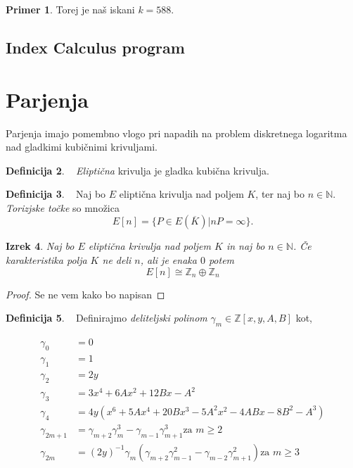 \documentclass[12pt,a4paper,twoside]{article}
\theoremstyle{definition} %
\newtheorem{definicija}{Definicija}[section]
\newtheorem{primer}[definicija]{Primer}
\theoremstyle{plain} %
\newtheorem{izrek}[definicija]{Izrek}
\numberwithin{equation}{section}  %
\newcommand{\N}{\mathbb N}
\newcommand{\Z}{\mathbb Z}
\newcommand{\E}[1]{E({#1})}
\begin{document}
\begin{primer}
Torej je naš iskani $k=588$.

\end{primer}
\subsection{Index Calculus program}


\section{Parjenja}

Parjenja imajo pomembno vlogo pri napadih na problem diskretnega logaritma nad gladkimi kubičnimi krivuljami.

\begin{definicija}~
\emph{Eliptična} krivulja je gladka kubična krivulja.
\end{definicija}

\begin{definicija}~
Naj bo $E$ eliptična krivulja nad poljem $K$, ter naj bo $n\in \N$. \emph{Torizjske točke} so množica
$$E[n] = \{ P \in \E{\overline{K}} | nP = \infty \}.$$
\end{definicija}

\begin{izrek}
\label{IzrekTor}
Naj bo $E$ eliptična krivulja nad poljem $K$ in naj bo $n \in \N$. Če karakteristika polja $K$ ne deli $n$, ali je enaka $0$ potem
$$E[n] \cong \mathbb{Z}_n \oplus \mathbb{Z}_n$$

\end{izrek}

\begin{proof}
Se ne vem kako bo napisan
\end{proof}

\begin{definicija}~
Definirajmo \emph{deliteljski polinom} $\gamma_m \in \Z[x,y,A,B]$ kot,


\begin{align}
\gamma_0 &{}= 0  \nonumber \\
\gamma_1 &{}= 1  \nonumber \\
\gamma_2 &{}= 2y  \nonumber \\
\gamma_3 &{}= 3x^4 + 6Ax^2 + 12Bx-A^2 \nonumber \\
\gamma_4 &{}= 4y(x^6+5Ax^4+20Bx^3-5A^2x^2-4ABx-8B^2-A^3) \nonumber \\
\gamma_{2m+1} &{}= \gamma_{m+2}\gamma_{m}^3-\gamma_{m-1}\gamma_{m+1}^3 \text{za } m \geq 2 \nonumber \\
\gamma_{2m} &{}= (2y)^{-1}\gamma_{m}(\gamma_{m+2}\gamma_{m-1}^2-\gamma_{m-2}\gamma_{m+1}^2)\text{za } m \geq 3 \nonumber
\end{align}

\end{definicija}
\end{document}
